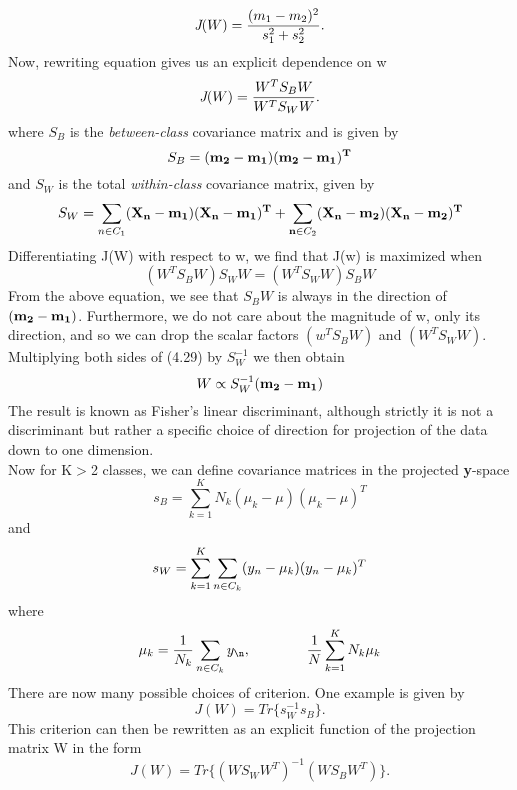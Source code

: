 \documentclass[12pt, letterpaper]{article}
\begin{document}
\[\emph{J}(W) = \frac{(m_1 - m_2)^2}{s_1^2 + s_2^2}.\]
Now, rewriting equation gives us an explicit dependence on w
\[\emph{J}(W) = \frac{W^TS_BW}{W^TS_WW}.\]
where \(S_B\) is the \textit{between-class} covariance matrix and is given by
\[S_B =(\bf{m_2 -m_1})(\bf{m_2 -m_1})^T\]
and \(S_W\) is the total \textit{within-class} covariance matrix, given by
\[S_W = \sum_{n \in \emph{\(C_1\)}}(\bf{X_n - m_1})(\bf{X_n - m_1})^T + \sum_{n \in \emph{\(C_2\)}}(\bf{X_n - m_2})(\bf{X_n - m_2})^T \]
Differentiating J(W) with respect to w, we find that J(w) is maximized when
\[(W^TS_BW)S_WW = (W^TS_WW)S_BW\]
From the above equation, we see that \(S_BW\) is always in the direction of \((\bf{m_2 - m_1} )\). Furthermore,
we do not care about the magnitude of w, only its direction, and so we can drop the scalar factors \((w^TS_BW)\) and \((W^TS_WW)\).\\
Multiplying both sides of (4.29) by \(S_W^{-1}\) we then obtain
\[W \propto S_W^{-1}(\bf{m_2 - m_1}) \]
The result is known as Fisher’s linear discriminant, although strictly it
is not a discriminant but rather a specific choice of direction for projection of the
data down to one dimension.\\

Now for K\(>\)2 classes, we can define covariance matrices in the projected \textbf{y}-space
\[s_B = \sum_{k=1}^{K}N_k( \mu_k - \mu)(\mu_k - \mu)^T\]
and
\[s_W = \sum_{k=1}^{K}\sum_{n \in \emph{\(C_k\)}}( y_n - \mu_k)(y_n - 	\mu_k)^T \]
where
\[ \mu_k = \frac{1}{N_k} \sum_{n \in C_k}y_\n, \qquad \qquad \frac{1}{N}\sum_{k=1}^{K}N_k\mu_k \]
There are now many possible choices of criterion. One example is given by
\[J(W) = Tr\{s_W^{-1}s_B\}.\]
This criterion can then be rewritten as an explicit function of the projection matrix
W in the form
\[J(W) = Tr\{(WS_WW^T)^{-1}(WS_BW^T)\}.\]
\end{document}
